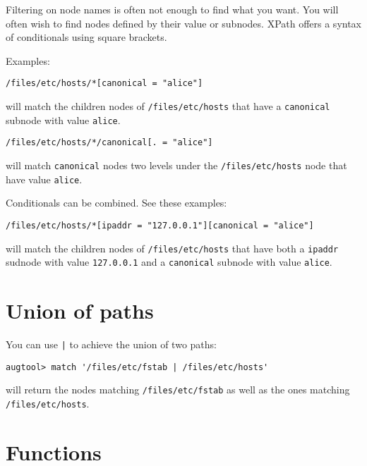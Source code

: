 Filtering on node names is often not enough to find what you want. You will often wish to find nodes defined by their value or subnodes. XPath offers a syntax of conditionals using square brackets.

Examples:

\begin{verbatim}
/files/etc/hosts/*[canonical = "alice"]
\end{verbatim}
will match the children nodes of \nolinkurl{/files/etc/hosts} that have a \verb!canonical! subnode with value \verb!alice!.

\begin{verbatim}
/files/etc/hosts/*/canonical[. = "alice"]
\end{verbatim}
will match \verb!canonical! nodes two levels under the \nolinkurl{/files/etc/hosts} node that have value \verb!alice!.

\begin{quote}

\end{quote}
Conditionals can be combined. See these examples:

\begin{verbatim}
/files/etc/hosts/*[ipaddr = "127.0.0.1"][canonical = "alice"]
\end{verbatim}
will match the children nodes of \nolinkurl{/files/etc/hosts} that have both a \verb!ipaddr! sudnode with value \verb!127.0.0.1! and a \verb!canonical! subnode with value \verb!alice!.

\section{Union of paths}

You can use \verb!|! to achieve the union of two paths:

\begin{verbatim}
augtool> match '/files/etc/fstab | /files/etc/hosts'
\end{verbatim}
will return the nodes matching \nolinkurl{/files/etc/fstab} as well as the ones matching \nolinkurl{/files/etc/hosts}.

\section{Functions}

